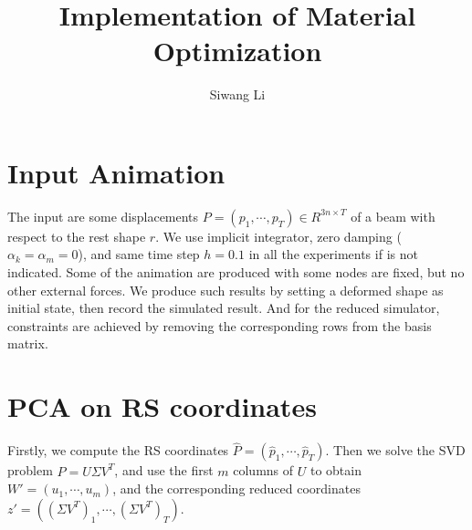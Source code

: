 \documentclass[twocolumn,a4paper]{article}
\author{Siwang Li}
\title{Implementation of Material Optimization}
\begin{document}
\maketitle

\section{Input Animation}
The input are some displacements $P = (p_1,\cdots,p_T) \in R^{3n\times T}$ of a
beam with respect to the rest shape $r$. We use implicit integrator, zero
damping ($\alpha_k=\alpha_m=0$), and same time step $h=0.1$ in all the
experiments if is not indicated. Some of the animation are produced with some
nodes are fixed, but no other external forces. We produce such results by
setting a deformed shape as initial state, then record the simulated result. And
for the reduced simulator, constraints are achieved by removing the
corresponding rows from the basis matrix.

\section{PCA on RS coordinates}
Firstly, we compute the RS coordinates $\hat{P} =
(\hat{p}_1,\cdots,\hat{p}_T)$.  Then we solve the SVD problem $\hat{P} = U\Sigma
V^T$, and use the first $m$ columns of $U$ to obtain $W' = (u_1,\cdots,u_m)$,
and the corresponding reduced coordinates $z' = ((\Sigma V^T)_1,\cdots,(\Sigma
V^T)_T)$.
\end{document}
